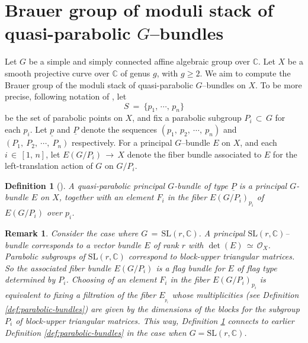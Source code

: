 \documentclass[10pt,reqno]{amsart}
\newcommand{\mc}[1]{\mathcal{#1}}
\newcommand{\bb}[1]{\mathbb{#1}}
\theoremstyle{myroman}
\newtheorem{definition}[theorem]{Definition}
\newtheorem{remark}[theorem]{Remark}
\numberwithin{equation}{section}
\begin{document}
		\section{Brauer group of moduli stack of quasi-parabolic 
			$G$--bundles}\label{section:brauer-group-quasi-parabolic-bundles}
		
		Let $G$ be a simple and simply connected affine algebraic group over $\bb{C}$. Let $X$ be a smooth projective
		curve over $\bb{C}$ of genus $g$, with $g\geq 2$. We aim to compute the Brauer group of the moduli stack of
		quasi-parabolic $G$--bundles on $X$. To be more precise, following notation of \cite{LS97}, let 
		$$S\ =\ \{p_1,\,\cdots,\,p_n\}$$ 
		be the set of parabolic points on $X$, and fix a parabolic subgroup $P_i\, \subset\,G$
		for each $p_i$. Let $\underline{p}$ and $\underline{P}$ denote the sequences $(p_1,\ p_2,\ \cdots,\ p_n)$
		and $(P_1,\ P_2,\ \cdots,\ P_n)$ respectively. For a principal $G$--bundle $E$ on $X$, and each $i\,\in\,[1,\,n]$,
		let $E(G/P_i)\, \longrightarrow\, X$ denote the fiber bundle associated to $E$ for the left-translation
		action of $G$ on $G/P_i$.
		
		\begin{definition}[{\cite[(8.4)]{LS97}}]\label{def:quasi-parabolic-bundle}
			A \textit{quasi-parabolic principal $G$-bundle} of type $\underline{P}$ is a principal $G$-bundle $E$ on
			$X$, together with an element $F_i$ in the fiber $E(G/P_i)_{p_i}$ of $E(G/P_i)$ over $p_i$.
		\end{definition}
		
		\begin{remark}
			Consider the case where $G\,=\,\text{SL}(r,\bb{C})$. A principal $\text{SL}(r,\bb{C})$--bundle corresponds to a 
			vector bundle $E$ of rank $r$ with $\det(E)\,\simeq\,\mc{O}_X$. Parabolic subgroups of 
			$\text{SL}(r,\bb{C})$ correspond to block-upper triangular matrices. So 
			the associated fiber bundle $E\left(G/P_i\right)$ is a flag 
			bundle for $E$ of flag type determined by $P_i$. Choosing of an element $F_i$ in the 
			fiber $E\left(G/P_i\right)_{p_i}$ is equivalent to fixing a filtration of the fiber $E_{_{p_i}}$ whose 
			multiplicities (see Definition \ref{def:parabolic-bundles}) are given by the
			dimensions of the blocks for the subgroup 
			$P_i$ of block-upper triangular matrices. This way, Definition \ref{def:quasi-parabolic-bundle} connects to 
			earlier Definition \ref{def:parabolic-bundles} in the case when $G=\text{SL}(r,\bb{C})$.
		\end{remark}
		
\end{document}
